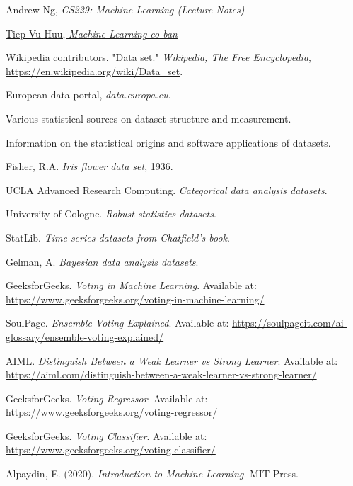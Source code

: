 \begin{thebibliography}{99}
    Andrew Ng, \textit{CS229: Machine Learning (Lecture Notes)}

    \href{https://machinelearningcoban.com/}{Tiep-Vu Huu, \textit{Machine Learning co ban}}

     Wikipedia contributors. "Data set." \textit{Wikipedia, The Free Encyclopedia}, \url{https://en.wikipedia.org/wiki/Data_set}.
    
     European data portal, \textit{data.europa.eu}.
    
     Various statistical sources on dataset structure and measurement.
    
     Information on the statistical origins and software applications of datasets.
    
     Fisher, R.A. \textit{Iris flower data set}, 1936.
    
     UCLA Advanced Research Computing. \textit{Categorical data analysis datasets}.
    
     University of Cologne. \textit{Robust statistics datasets}.
    
     StatLib. \textit{Time series datasets from Chatfield's book}.
    
     Gelman, A. \textit{Bayesian data analysis datasets}.
    
     GeeksforGeeks. \textit{Voting in Machine Learning}. Available at: \url{https://www.geeksforgeeks.org/voting-in-machine-learning/}
    
     SoulPage. \textit{Ensemble Voting Explained}. Available at: \url{https://soulpageit.com/ai-glossary/ensemble-voting-explained/}
    
     AIML. \textit{Distinguish Between a Weak Learner vs Strong Learner}. Available at: \url{https://aiml.com/distinguish-between-a-weak-learner-vs-strong-learner/}
    
     GeeksforGeeks. \textit{Voting Regressor}. Available at: \url{https://www.geeksforgeeks.org/voting-regressor/}
    
     GeeksforGeeks. \textit{Voting Classifier}. Available at: \url{https://www.geeksforgeeks.org/voting-classifier/}
    
     Alpaydin, E. (2020). \textit{Introduction to Machine Learning}. MIT Press.
    

\end{thebibliography}
